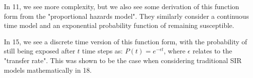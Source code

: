 \documentclass[11pt]{article}
\theoremstyle{definition}
\begin{document}
In 11, we see more complexity, but we also see some derivation of this function form from the "proportional hazards model". They similarly consider a continuous time model and an exponential probability function of remaining susceptible. \par 

In 15, we see a discrete time version of this function form, with the probability of still being exposed after $t$ time steps as:
$P(t) = e^{-\epsilon t}$, where $\epsilon$ relates to the "transfer rate". This was shown to be the case when considering traditional SIR models mathematically in 18.

\par 
\end{document}
